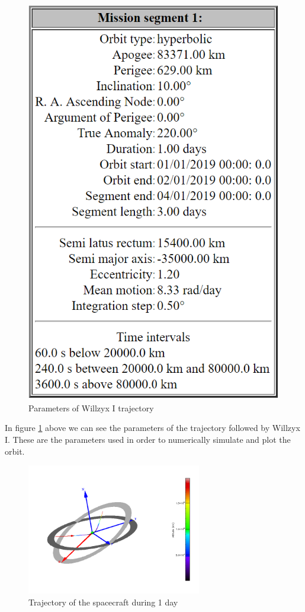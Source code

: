 \begin{figure}[H]
\centering
\includegraphics[scale=1]{figures/OrbitParameters.png}
\caption{Parameters of Willzyx I trajectory}
\label{OrbitParam}
\end{figure} 

In figure \ref{OrbitParam} above we can see the parameters of the trajectory followed by Willzyx I. These are the parameters used in order to numerically simulate and plot the orbit. 

\begin{figure}[H]
\centering
\includegraphics[width=0.68\textwidth]{figures/Trajectory.png}
\caption{Trajectory of the spacecraft during 1 day}
\label{Trajectory}
\end{figure}  

